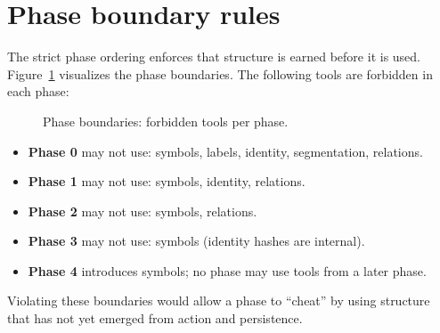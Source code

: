 
\appendix

\section{Phase boundary rules}
\label{app:boundaries}

The strict phase ordering enforces that structure is earned before it is used. Figure~\ref{fig:app:boundaries} visualizes the phase boundaries. The following tools are forbidden in each phase:

\begin{figure}[t]
\centering
{}
\caption{Phase boundaries: forbidden tools per phase.}
\label{fig:app:boundaries}
\end{figure}

\begin{itemize}
\item \textbf{Phase 0} may not use: symbols, labels, identity, segmentation, relations.
\item \textbf{Phase 1} may not use: symbols, identity, relations.
\item \textbf{Phase 2} may not use: symbols, relations.
\item \textbf{Phase 3} may not use: symbols (identity hashes are internal).
\item \textbf{Phase 4} introduces symbols; no phase may use tools from a later phase.
\end{itemize}

Violating these boundaries would allow a phase to ``cheat'' by using structure that has not yet emerged from action and persistence.

